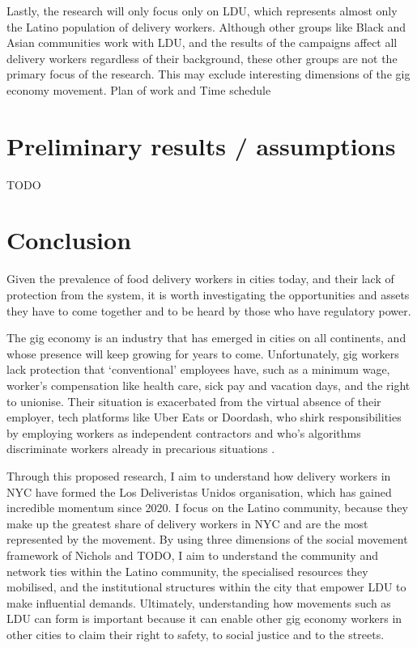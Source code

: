 \documentclass{article}
\begin{document}
Lastly, the research will only focus only on LDU, which represents almost only the Latino population of delivery workers. Although other groups like Black and Asian communities work with LDU, and the results of the campaigns affect all delivery workers regardless of their background, these other groups are not the primary focus of the research. This may exclude interesting dimensions of the gig economy movement. 
Plan of work and Time schedule

\section{Preliminary results / assumptions}

TODO

\section{Conclusion}

Given the prevalence of food delivery workers in cities today, and their lack of protection from the system, it is worth investigating the opportunities and assets they have to come together and to be heard by those who have regulatory power.

The gig economy is an industry that has emerged in cities on all continents, and whose presence will keep growing for years to come. Unfortunately, gig workers lack protection that `conventional’ employees have, such as a minimum wage, worker’s compensation like health care, sick pay and vacation days, and the right to unionise. Their situation is exacerbated from the virtual absence of their employer, tech platforms like Uber Eats or Doordash, who shirk responsibilities by employing workers as independent contractors and who’s algorithms discriminate workers already in precarious situations \parencite{kellogg2020algorithms}.

Through this proposed research, I aim to understand how delivery workers in NYC have formed the Los Deliveristas Unidos organisation, which has gained incredible momentum since 2020. I focus on the Latino community, because they make up the greatest share of delivery workers in NYC and are the most represented by the movement. By using three dimensions of the social movement framework of Nichols and TODO, I aim to understand the community and network ties within the Latino community, the specialised resources they mobilised, and the institutional structures within the city that empower LDU to make influential demands.
Ultimately, understanding how movements such as LDU can form is important because it can enable other gig economy workers in other cities to claim their right to safety, to social justice and to the streets. 

\printbibliography
\end{document}
